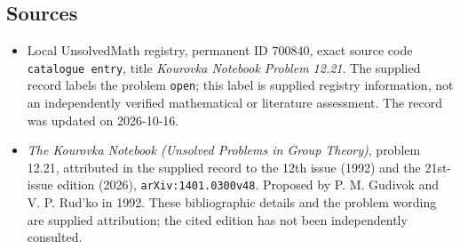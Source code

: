 \documentclass[11pt]{article}
\begin{document}
\subsection{Sources}
\begin{itemize}
\item Local UnsolvedMath registry, permanent ID \(700840\), exact source code \texttt{catalogue entry}, title \emph{Kourovka Notebook Problem 12.21}. The supplied record labels the problem \texttt{open}; this label is supplied registry information, not an independently verified mathematical or literature assessment. The record was updated on 2026-10-16.
\item \emph{The Kourovka Notebook (Unsolved Problems in Group Theory)}, problem 12.21, attributed in the supplied record to the 12th issue (1992) and the 21st-issue edition (2026), \texttt{arXiv:1401.0300v48}. Proposed by P. M. Gudivok and V. P. Rud'ko in 1992. These bibliographic details and the problem wording are supplied attribution; the cited edition has not been independently consulted.
\end{itemize}
\end{document}
